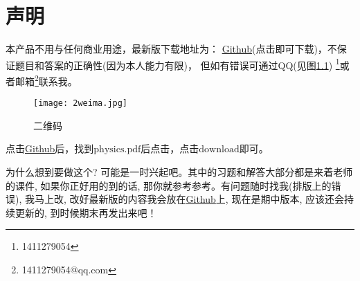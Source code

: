 \chapter{声明}
本产品不用与任何商业用途，最新版下载地址为：
\href{https://github.com/1411279054/Letax-learning-Note/tree/master/%E5%A4%A7%E5%AD%A6%E7%89%A9%E7%90%86%E5%A4%8D%E4%B9%A0%E6%8C%87%E5%8D%97}{Github}(点击即可下载)，不保证题目和答案的正确性(因为本人能力有限)，
但如有错误可通过QQ(见图\ref{fig:1}) \footnote{1411279054}或者邮箱\footnote{1411279054@qq.com}联系我。
\begin{figure}[htbp]
	\centering
	\texttt{[image: 2weima.jpg]}
	\caption{二维码}\label{fig:1}
\end{figure}

点击\href{https://github.com/1411279054/Letax-learning-Note/tree/master/%E5%A4%A7%E5%AD%A6%E7%89%A9%E7%90%86%E5%A4%8D%E4%B9%A0%E6%8C%87%E5%8D%97}{Github}后，找到$\mathrm{physics.pdf}$后点击，点击$\mathrm{download}$即可。
\\
\begin{remarkname}
	为什么想到要做这个? 可能是一时兴起吧。其中的习题和解答大部分都是来着老师的课件, 如果你正好用的到的话, 那你就参考参考。有问题随时找我(排版上的错误), 我马上改, 改好最新版的内容我会放在\href{https://github.com/1411279054/Letax-learning-Note/tree/master/%E5%A4%A7%E5%AD%A6%E7%89%A9%E7%90%86%E5%A4%8D%E4%B9%A0%E6%8C%87%E5%8D%97}{Github}上, 现在是期中版本, 应该还会持续更新的, 到时候期末再发出来吧！
\end{remarkname}
